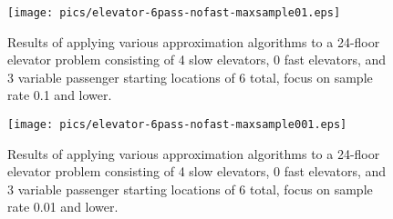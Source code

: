 \begin{figure}
\begin{center}
\texttt{[image: pics/elevator-6pass-nofast-maxsample01.eps]}
\caption{Results of applying various approximation algorithms to a 24-floor elevator problem consisting of 4 slow elevators, 0 fast elevators, and 3 variable passenger starting locations of 6 total, focus on sample rate 0.1 and lower.}
\label{fig:elevator-6pass-nofast-maxsample01}
\end{center}
\end{figure}

\begin{figure}
\begin{center}
\texttt{[image: pics/elevator-6pass-nofast-maxsample001.eps]}
\caption{Results of applying various approximation algorithms to a 24-floor elevator problem consisting of 4 slow elevators, 0 fast elevators, and 3 variable passenger starting locations of 6 total, focus on sample rate 0.01 and lower.}
\label{fig:elevator-6pass-nofast-maxsample001}
\end{center}
\end{figure}







